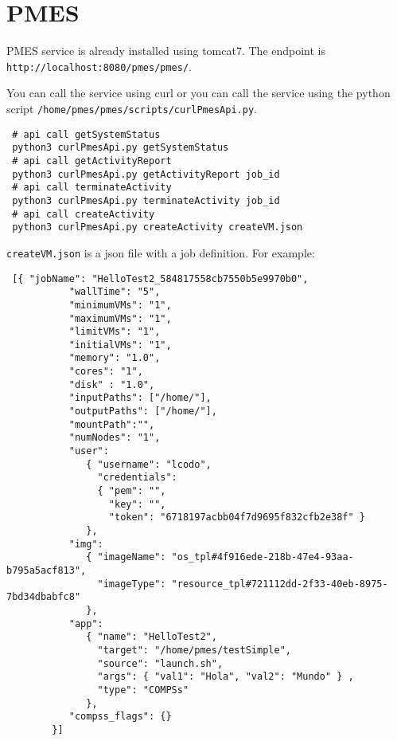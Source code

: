 \documentclass[a4paper,10pt]{article}
\begin{document}
\section{PMES}
PMES service is already installed using tomcat7. The endpoint is \texttt{http://localhost:8080/pmes/pmes/}.

You can call the service using curl or you can call the service using the python script \texttt{/home/pmes/pmes/scripts/curlPmesApi.py}.

\begin{verbatim}
 # api call getSystemStatus
 python3 curlPmesApi.py getSystemStatus
 # api call getActivityReport
 python3 curlPmesApi.py getActivityReport job_id
 # api call terminateActivity
 python3 curlPmesApi.py terminateActivity job_id
 # api call createActivity
 python3 curlPmesApi.py createActivity createVM.json
\end{verbatim}

\texttt{createVM.json} is a json file with a job definition. For example:
\begin{verbatim}
 [{ "jobName": "HelloTest2_584817558cb7550b5e9970b0",
           "wallTime": "5",
           "minimumVMs": "1",
           "maximumVMs": "1",
           "limitVMs": "1",
           "initialVMs": "1",
           "memory": "1.0",
           "cores": "1",
           "disk" : "1.0",
           "inputPaths": ["/home/"],
           "outputPaths": ["/home/"],
           "mountPath":"",
           "numNodes": "1",
           "user":
              { "username": "lcodo",
                "credentials":
                { "pem": "",
                  "key": "",
                  "token": "6718197acbb04f7d9695f832cfb2e38f" }
              },
           "img": 
              { "imageName": "os_tpl#4f916ede-218b-47e4-93aa-b795a5acf813", 
                "imageType": "resource_tpl#721112dd-2f33-40eb-8975-7bd34dbabfc8"
              },
           "app":
              { "name": "HelloTest2",
                "target": "/home/pmes/testSimple",
                "source": "launch.sh",
                "args": { "val1": "Hola", "val2": "Mundo" } ,
                "type": "COMPSs"
              },
           "compss_flags": {}
        }]
\end{verbatim}
\end{document}
